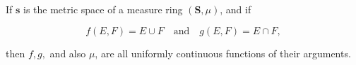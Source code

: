 If $\mathbf{s}$ is the metric space of a measure ring $(\mathbf{S},\mu)$, and if

$$f(E,F) = E \cup F \quad \text{and} \quad g(E,F) = E \cap F,$$

then $f, g,$ and also $\mu$, are all uniformly continuous functions of their arguments.
